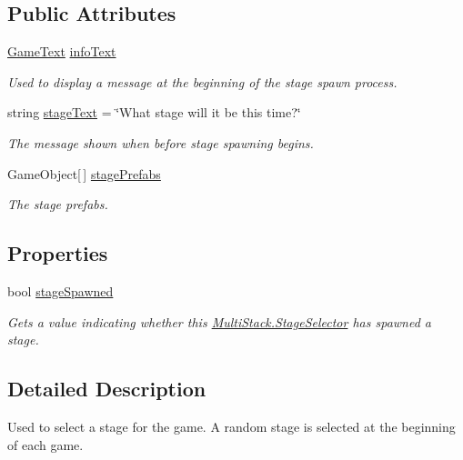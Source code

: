 \subsection*{Public Attributes}
\begin{DoxyCompactItemize}
\item 
\hyperlink{class_multi_stack_1_1_game_text}{Game\+Text} \hyperlink{class_multi_stack_1_1_stage_selector_a6f837e9ba7fc2d949f2d36ef97159835}{info\+Text}
\begin{DoxyCompactList}\small\item\em Used to display a message at the beginning of the stage spawn process. \end{DoxyCompactList}\item 
string \hyperlink{class_multi_stack_1_1_stage_selector_a199ae7412400d6e934dba1d2dc6b4f45}{stage\+Text} = \char`\"{}What stage will it be this time?\char`\"{}
\begin{DoxyCompactList}\small\item\em The message shown when before stage spawning begins. \end{DoxyCompactList}\item 
Game\+Object\mbox{[}$\,$\mbox{]} \hyperlink{class_multi_stack_1_1_stage_selector_ac258ba40874a76a4293c7ed3b9a424d9}{stage\+Prefabs}
\begin{DoxyCompactList}\small\item\em The stage prefabs. \end{DoxyCompactList}\end{DoxyCompactItemize}
\subsection*{Properties}
\begin{DoxyCompactItemize}
\item 
bool \hyperlink{class_multi_stack_1_1_stage_selector_a72499a1e9a675f0fc6d2923d4c1daf51}{stage\+Spawned}
\begin{DoxyCompactList}\small\item\em Gets a value indicating whether this \hyperlink{class_multi_stack_1_1_stage_selector}{Multi\+Stack.\+Stage\+Selector} has spawned a stage. \end{DoxyCompactList}\end{DoxyCompactItemize}


\subsection{Detailed Description}
Used to select a stage for the game. A random stage is selected at the beginning of each game. 



